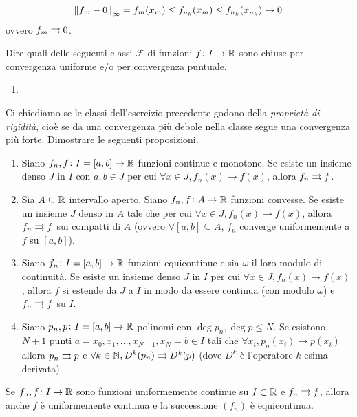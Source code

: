 \documentclass[a4paper]{article}\par \usepackage{style}\par
\begin{document}
\begin{equation*}
  \norm{f_m - 0}_{\infty} = f_m(x_m) \leq f_{n_k}(x_m) \leq f_{n_k}(x_{n_k}) \to 0
\end{equation*}
ovvero $ f_m \rightrightarrows 0 $.\par \begin{es}
  Dire quali delle seguenti classi $ \mathcal{F} $ di funzioni $ f \colon I \to \mathbb{R} $ sono chiuse per convergenza uniforme e/o per convergenza puntuale.
  \begin{enumerate}[label = (\roman*)]
  \item
  \end{enumerate}
\end{es}\par \begin{es}
  Ci chiediamo se le classi dell'esercizio precedente godono della \emph{proprietà di rigidità}, cioè se da una convergenza più debole nella classe segue una convergenza più forte. Dimostrare le seguenti proposizioni.
  \begin{enumerate}[label = (\roman*)]
  \item Siano $ f_n, f \colon I = [a, b] \to \mathbb{R} $ funzioni continue e monotone. Se esiste un insieme denso $ J $ in $ I $ con $ a, b \in J $ per cui $ \forall x \in J, f_n(x) \to f(x) $, allora $ f_n \rightrightarrows f $.
  \item Sia $ A \subseteq \mathbb{R} $ intervallo aperto. Siano $ f_n, f \colon A \to \mathbb{R} $ funzioni convesse. Se esiste un insieme $ J $ denso in $ A $ tale che per cui $ \forall x \in J, f_n(x) \to f(x) $, allora $ f_n \rightrightarrows f $ sui compatti di $ A $ (ovvero $ \forall [a, b] \subseteq A $, $ f_n $ converge uniformemente a $ f $ su $ [a, b] $).
  \item Siano $ f_n \colon I = [a, b] \to \mathbb{R} $ funzioni equicontinue e sia $ \omega $ il loro modulo di continuità. Se esiste un insieme denso $ J $ in $ I $ per cui $ \forall x \in J, f_n(x) \to f(x) $, allora $ f $ si estende da $ J $ a $ I $ in modo da essere continua (con modulo $ \omega $) e $ f_n \rightrightarrows f $ su $ I $.
  \item Siano $ p_n, p \colon I = [a, b] \to \mathbb{R} $ polinomi con $ \deg{p_n}, \deg{p} \leq N $. Se esistono $ N + 1 $ punti $ a = x_0, x_1, \ldots, x_{N - 1}, x_N = b \in I $ tali che $ \forall x_i, p_n(x_i) \to p(x_i) $ allora $ p_n \rightrightarrows p $ e $ \forall k \in \mathbb{N}, D^{k}(p_n) \rightrightarrows D^{k}(p) $ (dove $ D^{k} $ è l'operatore $ k $-esima derivata).
  \end{enumerate}
\end{es}\par \begin{es}
  Se $ f_n, f \colon I \to \mathbb{R} $ sono funzioni uniformemente continue su $ I \subset \mathbb{R} $ e $ f_n \rightrightarrows f $, allora anche $ f $ è uniformemente continua e la successione $ (f_n) $ è equicontinua.
\end{es}\par 
\end{document}

